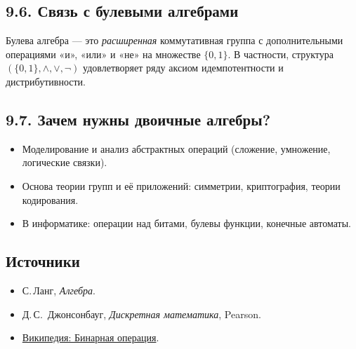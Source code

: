 \documentclass{article}
\begin{document}
\subsection*{9.6. Связь с булевыми алгебрами}

Булева алгебра — это \emph{расширенная} коммутативная группа с дополнительными операциями «и», «или» и «не» на множестве $\{0,1\}$.  
В частности, структура $(\{0,1\},\wedge,\vee,\neg)$ удовлетворяет ряду аксиом идемпотентности и дистрибутивности.

\subsection*{9.7. Зачем нужны двоичные алгебры?}

\begin{itemize}[leftmargin=*]
  \item Моделирование и анализ абстрактных операций (сложение, умножение, логические связки).
  \item Основа теории групп и её приложений: симметрии, криптография, теории кодирования.
  \item В информатике: операции над битами, булевы функции, конечные автоматы.
\end{itemize}

\subsection*{Источники}

\begin{itemize}
  \item С.\,Ланг, \emph{Алгебра}.
  \item Д.\,С. Джонсонбауг, \emph{Дискретная математика}, Pearson.
  \item \href{https://ru.wikipedia.org/wiki/Бинарная_операция}{Википедия: Бинарная операция}.
\end{itemize}
\end{document}
